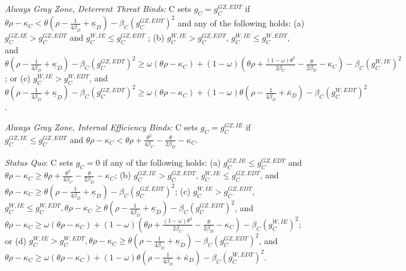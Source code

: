 \documentclass[11pt,letterpaper,pdftex,dvipsnames,table]{article}
\begin{document}
\textit{Always Gray Zone, Deterrent Threat Binds:}\textbf{ }C sets
$g_{C}=g_{C}^{GZ,EDT}$
if $\theta\rho-\kappa_{C}<\theta\left(\rho-\frac{1}{4\beta_{D}}+\underline{\kappa}_{D}\right)-\beta_{C}\left(g_{C}^{GZ,EDT}\right)^{2}$ and any of the following holds: (a)\textbf{ }$g_{C}^{GZ,IE}>g_{C}^{GZ,EDT}$ and $g_{C}^{W,IE}\le g_{C}^{GZ,EDT}$ ; (b) $g_{C}^{W,IE}>g_{C}^{GZ,EDT}$, $g_{C}^{W,IE}\le g_{C}^{W,EDT},$ and $\theta\left(\rho-\frac{1}{4\beta_{D}}+\underline{\kappa}_{D}\right)-\beta_{C}\left(g_{C}^{GZ,EDT}\right)^{2}\geq\omega\left(\theta\rho-\kappa_{C}\right)+(1-\omega)\left(\theta\rho+\frac{(1-\omega)\theta^{2}}{2\beta_{C}}-\frac{\theta}{2\beta_{D}}-\kappa_{C}\right)-\beta_{C}\left(g_{C}^{W,IE}\right)^{2}$; or (c) $g_{C}^{W,IE}>g_{C}^{W,EDT}$, and $\theta\left(\rho-\frac{1}{4\beta_{D}}+\underline{\kappa}_{D}\right)-\beta_{C}\left(g_{C}^{GZ,EDT}\right)^{2}\geq\omega\left(\theta\rho-\kappa_{C}\right)+(1-\omega)\theta\left(\rho-\frac{1}{4\beta_{D}}+\bar{\kappa}_{D}\right)-\beta_{C}\left(g_{C}^{W,EDT}\right)^{2}$.

\textit{Always Gray Zone, Internal Efficiency Binds:} C sets 
$g_{C}=g_{C}^{GZ,IE}$
if 
$g_{C}^{GZ,IE}\leq g_{C}^{GZ,EDT}$ and $\theta\rho-\kappa_{C}<\theta\rho+\frac{\theta^{2}}{4\beta_{C}}-\frac{\theta}{2\beta_{D}}-\kappa_{C}$.

\textit{Status Quo}: C sets $g_{C}=0$ if any of the following holds: (a) $g_{C}^{GZ,IE}\leq g_{C}^{GZ,EDT}$ and $\theta\rho-\kappa_{C}\geq\theta\rho+\frac{\theta^{2}}{4\beta_{C}}-\frac{\theta}{2\beta_{D}}-\kappa_{C}$; (b) $g_{C}^{GZ,IE}>g_{C}^{GZ,EDT}$, $g_{C}^{W,IE}\leq g_{C}^{GZ,EDT}$, and $\theta\rho-\kappa_{C}\geq\theta\left(\rho-\frac{1}{4\beta_{D}}+\underline{\kappa}_{D}\right)-\beta_{C}\left(g_{C}^{GZ,EDT}\right)^{2}$; (c) $g_{C}^{W,IE}>g_{C}^{GZ,EDT}$, $g_{C}^{W,IE}\le g_{C}^{W,EDT},$$\theta\rho-\kappa_{C}\geq\theta\left(\rho-\frac{1}{4\beta_{D}}+\underline{\kappa}_{D}\right)-\beta_{C}\left(g_{C}^{GZ,EDT}\right)^{2}$, and $\theta\rho-\kappa_{C}\geq\omega\left(\theta\rho-\kappa_{C}\right)+(1-\omega)\left(\theta\rho+\frac{(1-\omega)\theta^{2}}{2\beta_{C}}-\frac{\theta}{2\beta_{D}}-\kappa_{C}\right)-\beta_{C}\left(g_{C}^{W,IE}\right)^{2}$; or (d) $g_{C}^{W,IE}>g_{C}^{W,EDT},$$\theta\rho-\kappa_{C}\geq\theta\left(\rho-\frac{1}{4\beta_{D}}+\underline{\kappa}_{D}\right)-\beta_{C}\left(g_{C}^{GZ,EDT}\right)^{2}$, and $\theta\rho-\kappa_{C}\geq\omega\left(\theta\rho-\kappa_{C}\right)+(1-\omega)\theta\left(\rho-\frac{1}{4\beta_{D}}+\bar{\kappa}_{D}\right)-\beta_{C}\left(g_{C}^{W,EDT}\right)^{2}$.
\end{document}
